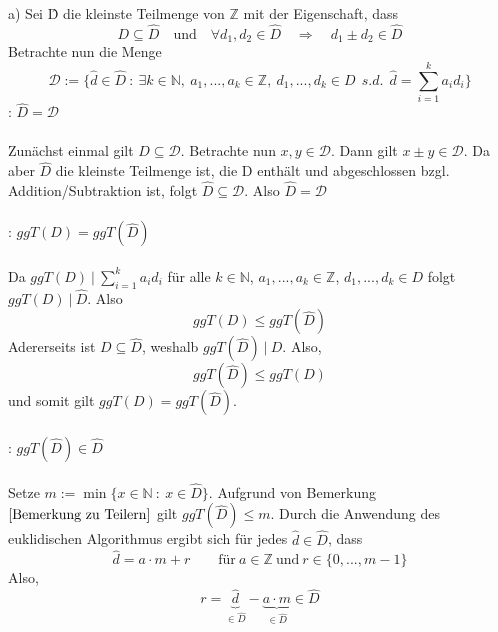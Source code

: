 a) Sei \^{D} die kleinste Teilmenge von $\mathbb{Z}$ mit der Eigenschaft, dass
\begin{equation*}
D \subseteq \hat{D} \quad \mathrm{und} \quad \forall d_{1},d_{2} \in \hat{D} \quad \Rightarrow \quad d_{1} \pm d_{2} \in \hat{D}
\end{equation*}
Betrachte nun die Menge
\begin{equation*}
\mathcal{D} := \lbrace \hat{d} \in \hat{D} \: : \: \exists k \in \mathbb{N}, \: a_{1},...,a_{k} \in \mathbb{Z}, \: d_{1},...,d_{k} \in D \: \: s.d. \: \: \hat{d} = \sum_{i=1}^{k} a_{i}d_{i} \rbrace
\end{equation*}
: $\hat{D} = \mathcal{D}$
\\
\\
Zunächst einmal gilt $D \subseteq \mathcal{D}$. Betrachte nun $x,y \in \mathcal{D}$. Dann gilt $x \pm y \in \mathcal{D}$. Da aber $\hat{D}$ die kleinste Teilmenge ist, die D enthält und abgeschlossen bzgl. Addition/Subtraktion ist, folgt $\hat{D} \subseteq \mathcal{D}$. Also $\hat{D} = \mathcal{D}$
\\
\\
: $ggT(D) = ggT(\hat{D})$
\\
\\
Da $ggT(D) \: | \: \sum_{i=1}^{k} a_{i}d_{i}$ für alle $k \in \mathbb{N}$, $a_{1},...,a_{k} \in \mathbb{Z}$, $d_{1},...,d_{k} \in D$ folgt $ggT(D) \: | \: \hat{D}$. Also
\begin{equation*}
ggT(D) \leq ggT(\hat{D})
\end{equation*}
Adererseits ist $D \subseteq \hat{D}$, weshalb $ggT(\hat{D}) \: | \: D$. Also,
\begin{equation*}
ggT(\hat{D}) \leq ggT(D)
\end{equation*}
und somit gilt $ggT(D) = ggT(\hat{D})$.
\\
\\
: $ggT(\hat{D}) \in \hat{D}$
\\
\\
Setze $m := \min \lbrace x \in \mathbb{N} \: : \: x \in \hat{D} \rbrace$. Aufgrund von Bemerkung $\ref{Bemerkung zu Teilern}$ gilt $ggT(\hat{D}) \leq m$. Durch die Anwendung des euklidischen Algorithmus ergibt sich für jedes $\hat{d} \in \hat{D}$, dass
\begin{equation*}
\hat{d} = a \cdot m + r \qquad \mathrm{für} \: a \in \mathbb{Z} \: \mathrm{und} \: r \in \lbrace 0,...,m-1 \rbrace
\end{equation*}
Also,
\begin{equation*}
r = \underbrace{\hat{d}}_{\in \hat{D}} - \underbrace{a \cdot m}_{\in \hat{D}} \in \hat{D}
\end{equation*}
